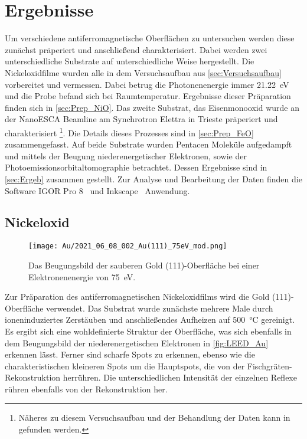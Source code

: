 \chapter{Ergebnisse}
    Um verschiedene antiferromagnetische Oberflächen zu untersuchen werden diese zunächst präperiert und anschließend charakterisiert.
    Dabei werden zwei unterschiedliche Substrate auf unterschiedliche Weise hergestellt.
    Die Nickeloxidfilme wurden alle in dem Versuchsaufbau aus \autoref{sec:Versuchsaufbau} vorbereitet und vermessen.
    Dabei betrug die Photonenenergie immer \SI{21.22}{\electronvolt} und die Probe befand sich bei Raumtemperatur.
    Ergebnisse dieser Präparation finden sich in \autoref{sec:Prep_NiO}.
    Das zweite Substrat, das Eisenmonooxid wurde an der NanoESCA Beamline am Synchrotron Elettra in Trieste präperiert und charakterisiert \footnote{Näheres zu diesem Versuchsaufbau und der Behandlung der Daten kann in~\cite{ma-DJ} gefunden werden.}.
    Die Details dieses Prozesses sind in \autoref{sec:Prep_FeO} zusammengefasst.
    Auf beide Substrate wurden Pentacen Moleküle aufgedampft und mittels der Beugung niederenergetischer Elektronen, sowie der Photoemissionsorbitaltomographie betrachtet.
    Dessen Ergebnisse sind in \autoref{sec:Ergeb} zusammen gestellt.
    Zur Analyse und Bearbeitung der Daten finden die Software IGOR Pro 8~\cite{IGOR} und Inkscape~\cite{Inkscape} Anwendung.

    \section{Nickeloxid} \label{sec:Prep_NiO}
        \begin{figure}
            \centering
            \texttt{[image: Au/2021\_06\_08\_002\_Au(111)\_75eV\_mod.png]}            
            \caption{Das Beugungsbild der sauberen Gold (111)-Oberfläche bei einer Elektronenenergie von \SI{75}{\electronvolt}.}
            \label{fig:LEED_Au}
        \end{figure}
        Zur Präparation des antiferromagnetischen Nickeloxidfilms wird die Gold (111)-Oberfläche verwendet.
        Das Substrat wurde zunächste mehrere Male durch ioneninduziertes Zerstäuben und anschließendes Aufheizen auf \SI{500}{\celsius} gereinigt.
        Es ergibt sich eine wohldefinierte Struktur der Oberfläche, was sich ebenfalls in dem Beugungsbild der niederenergetischen Elektronen in \autoref{fig:LEED_Au} erkennen lässt.
        Ferner sind scharfe Spots zu erkennen, ebenso wie die charakteristischen kleineren Spots um die Hauptspots, die von der Fischgräten-Rekonstruktion herrühren.
        Die unterschiedlichen Intensität der einzelnen Reflexe rühren ebenfalls von der Rekonstruktion her.

